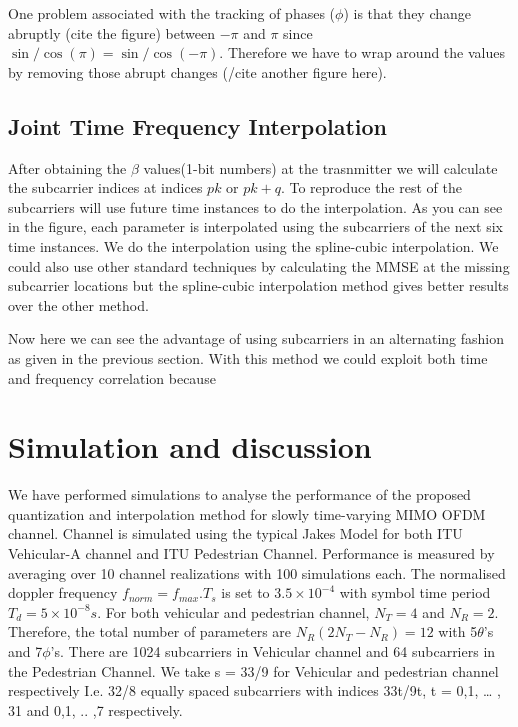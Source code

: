 \documentclass[conference]{IEEEtran}
\begin{document}
One problem associated with the tracking of phases ($\phi$) is that they change abruptly (cite the figure) between $-\pi$ and $\pi$ since $\sin/\cos(\pi) =\sin/\cos(-\pi)$. Therefore we have to wrap around the values by removing those abrupt changes (/cite another figure here).


\subsection{Joint Time Frequency Interpolation}
\label{interp}

After obtaining the $\beta$ values(1-bit numbers) at the trasnmitter we will calculate the subcarrier indices at indices $pk$ or $pk+q$. To reproduce the rest of the subcarriers will use future time instances to do the interpolation. As you can see in the figure, each parameter is interpolated using the subcarriers of the next six time instances. We do the interpolation using the spline-cubic interpolation. We could also use other standard techniques by calculating the MMSE at the missing subcarrier locations but the spline-cubic interpolation method gives better results over the other method.

Now here we can see the advantage of using subcarriers in an alternating fashion as given in the previous section. With this method we could exploit both time and frequency correlation because

\section{Simulation and discussion}
\label{section3}

 We have performed simulations to analyse the performance of the proposed quantization and interpolation method for slowly time-varying MIMO OFDM channel. Channel is simulated using the typical Jakes Model for both ITU Vehicular-A channel and ITU Pedestrian Channel. Performance is measured by averaging over 10 channel realizations with 100 simulations each. The normalised doppler frequency $f_{norm} = f_{max}.T_s$ is set to $3.5\times10^{-4}$ with symbol time period $T_d = 5\times10^{-8} s$. For both vehicular and pedestrian channel, $N_T=4$ and $N_R=2$. Therefore, the total number of parameters are $N_{R}(2N_{T} - N_{R}) = 12$ with 5$\theta$’s and 7$\phi$’s. There are 1024 subcarriers in Vehicular channel and 64 subcarriers in the Pedestrian Channel. We take s = 33/9 for Vehicular and pedestrian channel respectively I.e. 32/8 equally spaced subcarriers with indices 33t/9t, t = 0,1, … , 31 and 0,1, .. ,7 respectively.
\end{document}
